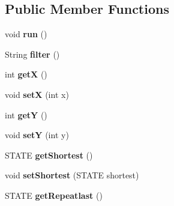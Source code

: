 \subsection*{Public Member Functions}
\begin{DoxyCompactItemize}
\item 
\hypertarget{classjson__objects_1_1tools_1_1_overlay_af46693929141d69fb4bd4f9f1ba59fcb}{
void {\bfseries run} ()}
\label{classjson__objects_1_1tools_1_1_overlay_af46693929141d69fb4bd4f9f1ba59fcb}

\item 
\hypertarget{classjson__objects_1_1tools_1_1_overlay_a4a05fbb9154a2b300d7c23d854c0f8be}{
String {\bfseries filter} ()}
\label{classjson__objects_1_1tools_1_1_overlay_a4a05fbb9154a2b300d7c23d854c0f8be}

\item 
\hypertarget{classjson__objects_1_1tools_1_1_overlay_a9eca0fb2016bfab80ff0fcfbb653224a}{
int {\bfseries getX} ()}
\label{classjson__objects_1_1tools_1_1_overlay_a9eca0fb2016bfab80ff0fcfbb653224a}

\item 
\hypertarget{classjson__objects_1_1tools_1_1_overlay_a1e90d9d91e4d7a81ec23e2a99bffad5b}{
void {\bfseries setX} (int x)}
\label{classjson__objects_1_1tools_1_1_overlay_a1e90d9d91e4d7a81ec23e2a99bffad5b}

\item 
\hypertarget{classjson__objects_1_1tools_1_1_overlay_adc1c2973e91253221de6fa3991b12bf3}{
int {\bfseries getY} ()}
\label{classjson__objects_1_1tools_1_1_overlay_adc1c2973e91253221de6fa3991b12bf3}

\item 
\hypertarget{classjson__objects_1_1tools_1_1_overlay_a84dd5b046cdd1b7091003875f8c87b88}{
void {\bfseries setY} (int y)}
\label{classjson__objects_1_1tools_1_1_overlay_a84dd5b046cdd1b7091003875f8c87b88}

\item 
\hypertarget{classjson__objects_1_1tools_1_1_overlay_a30c30fa6be700cd946b7bb84c5e90375}{
STATE {\bfseries getShortest} ()}
\label{classjson__objects_1_1tools_1_1_overlay_a30c30fa6be700cd946b7bb84c5e90375}

\item 
\hypertarget{classjson__objects_1_1tools_1_1_overlay_a9a1c1499a12d1964214683e92be2dc89}{
void {\bfseries setShortest} (STATE shortest)}
\label{classjson__objects_1_1tools_1_1_overlay_a9a1c1499a12d1964214683e92be2dc89}

\item 
\hypertarget{classjson__objects_1_1tools_1_1_overlay_afb3da633f4e76e076716d2e0a0b6b074}{
STATE {\bfseries getRepeatlast} ()}
\label{classjson__objects_1_1tools_1_1_overlay_afb3da633f4e76e076716d2e0a0b6b074}


\end{DoxyCompactItemize}
